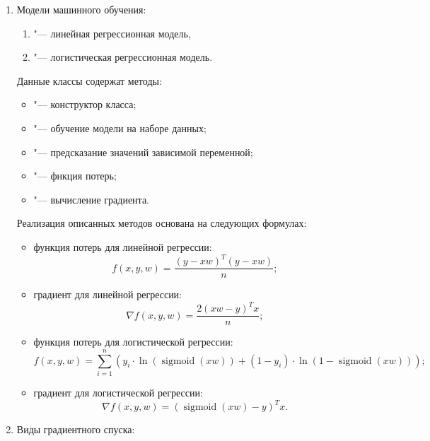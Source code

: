 \documentclass{article}
\begin{document}
\begin{enumerate}
    \item Модели машинного обучения:
    \begin{enumerate}
        \item {} "--- линейная регрессионная модель,
        \item {} "--- логистическая регрессионная модель.
    \end{enumerate}
    Данные классы содержат методы: 
    \begin{itemize}
        \item {} "--- конструктор класса;
        \item {} "---  обучение модели на наборе данных;
        \item {} "--- предсказание значений зависимой переменной;
        \item {} "--- фнкция потерь;
        \item {} "--- вычисление градиента.
    \end{itemize}
    Реализация описанных методов основана на следующих формулах:
    \begin{itemize}
        \item функция потерь для линейной регрессии:
        \[
            f(x,y,w) = \dfrac{(y - xw)^T(y - xw)}{n};
        \]
        \item градиент для линейной регрессии:
        \[
            \nabla f (x,y,w) = \dfrac{2(xw - y)^Tx}{n};
        \]
        \item функция потерь для логистической регрессии:
        \[
            f(x,y,w) =  \sum\limits_{i=1}^n \left(y_i \cdot \ln\left(\operatorname{sigmoid}(xw)\right) + (1-y_i)\cdot \ln\left(1- \operatorname{sigmoid}(xw)\right)\right);
        \]
        \item градиент для логистической регрессии:
        \[
            \nabla f(x,y,w) = \left(\operatorname{sigmoid}(xw) - y\right)^Tx.
        \]
    \end{itemize}
    \item Виды градиентного спуска:
    \begin{enumerate}

\end{enumerate}
\end{enumerate}
\end{document}
